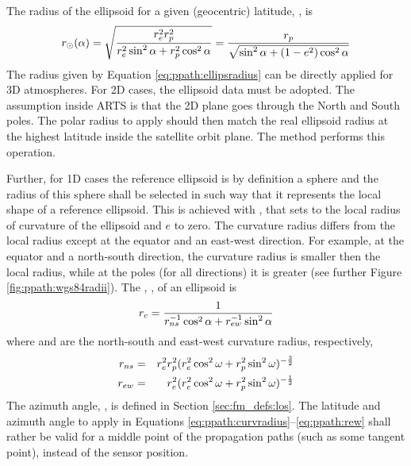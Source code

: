 The radius of the ellipsoid for a given (geocentric) latitude, \Lat, is
\begin{equation}
 r_{\odot}(\alpha) = \sqrt{\frac{r_{e}^2r_{p}^2}
                    {r_{e}^2\sin^2\alpha+r_{p}^2\cos^2\alpha}} =
  \frac{r_{p}}{\sqrt{\sin^2\alpha+(1-e^2)\cos^2\alpha}}
 \label{eq:ppath:ellipsradius} 
\end{equation}
The radius given by Equation \ref{eq:ppath:ellipsradius} can be directly
applied for 3D atmospheres. For 2D cases, the ellipsoid data must be adopted.
The assumption inside ARTS is that the 2D plane goes through the North and
South poles. The polar radius to apply should then match the real ellipsoid
radius at the highest latitude inside the satellite orbit plane. The method 
 performs this operation.


Further, for 1D cases the reference ellipsoid is by definition a sphere and the
radius of this sphere shall be selected in such way that it represents the
local shape of a reference ellipsoid. This is achieved with
, that sets  to the local radius of
curvature of the ellipsoid and $e$ to zero. The curvature radius differs from
the local radius except at the equator and an east-west direction. For example,
at the equator and a north-south direction, the curvature radius is smaller
then the local radius, while at the poles (for all directions) it is greater
(see further Figure \ref{fig:ppath:wgs84radii}). The , , of an ellipsoid is \citep{rodgers:00}
\begin{equation}
 r_{c} = \frac{1}{r_{ns}^{-1}\cos^2 \alpha + r_{ew}^{-1}\sin^2 \alpha}
 \label{eq:ppath:curvradius} 
\end{equation}
where  and  are the north-south and east-west curvature radius, respectively,
\begin{eqnarray}
 r_{ns} &=& r_{e}^2r_{p}^2 (
           r_{e}^2\cos^2\omega+r_{p}^2\sin^2\omega )^{-\frac{3}{2}} \\
 r_{ew} &=& r_{e}^2 (
           r_{e}^2\cos^2\omega+r_{p}^2\sin^2\omega )^{-\frac{1}{2}} 
 \label{eq:ppath:rew} 
\end{eqnarray}
The azimuth angle, \AzmAng, is defined in Section \ref{sec:fm_defs:los}. The
latitude and azimuth angle to apply in Equations
\ref{eq:ppath:curvradius}--\ref{eq:ppath:rew} shall rather be valid for a
middle point of the propagation paths (such as some tangent point), instead of
the sensor position.

